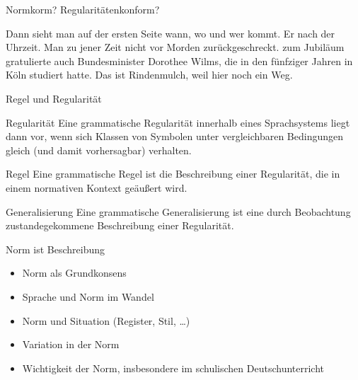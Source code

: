 \begin{frame}
  {Normkorm? Regularitätenkonform?}
  \pause
  \begin{exe}
    \ex
    \begin{xlist}
      \ex Dann sieht man auf der ersten Seite \alert{wann, wo und wer}  kommt.
      \pause
      \ex Er  nach der Uhrzeit.
      \pause
      \ex Man  zu jener Zeit nicht vor Morden \alert{zurückgeschreckt}.
      \pause
      \ex {} \alert{zum Jubiläum} gratulierte auch Bundesminister Dorothee Wilms, die in den fünfziger Jahren in Köln studiert hatte.
      \pause
      \ex Das ist Rindenmulch, \alert{weil} hier  noch ein Weg.
    \end{xlist}
  \end{exe}
\end{frame}


\begin{frame}
  {Regel und Regularität}
  \pause
  \begin{block}{Regularität}
    Eine grammatische Regularität innerhalb eines Sprachsystems liegt dann vor, wenn sich Klassen von Symbolen unter vergleichbaren Bedingungen gleich (und damit vorhersagbar) verhalten.
  \end{block}

  \pause
  \vspace{0.5\baselineskip}

  \begin{block}{Regel}
    Eine grammatische Regel ist die Beschreibung einer Regularität, die in einem normativen Kontext geäußert wird.
  \end{block}

  \pause
  \vspace{0.5\baselineskip}
  
  \begin{block}{Generalisierung}
    Eine grammatische Generalisierung ist eine durch Beobachtung zustandegekommene Beschreibung einer Regularität.
  \end{block}
\end{frame}

\begin{frame}
  {Norm ist Beschreibung}
  \pause
  \begin{itemize}[<+->]
    \item Norm als Grundkonsens
    \item Sprache und Norm im Wandel
    \item Norm und Situation (Register, Stil, \dots)
    \item Variation in der Norm
      \vspace{\baselineskip}
    \item \alert{Wichtigkeit der Norm, insbesondere im schulischen Deutschunterricht}
  \end{itemize}
\end{frame}

